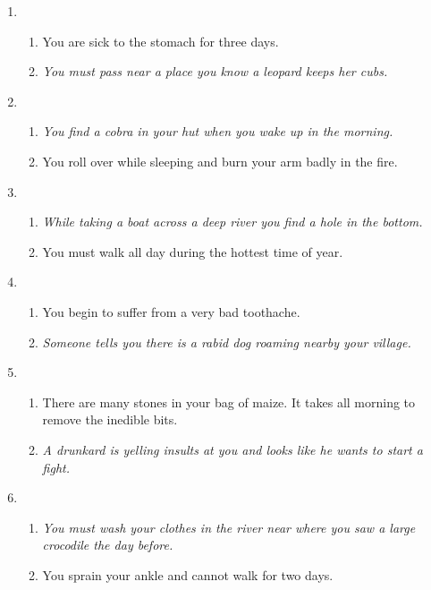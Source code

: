 \documentclass[idxtotoc,hyperref,openany]{labbook} %
\begin{document}
\begin{enumerate}
\item
\begin{enumerate}
\item You are sick to the stomach for three days.
\item  \emph{You must pass near a place you know a leopard keeps her cubs.}
\end{enumerate}

\item
\begin{enumerate} 
\item  \emph{You find a cobra in your hut when you wake up in the morning.}
\item You roll over while sleeping and burn your arm badly in the fire.
\end{enumerate}

\item 
\begin{enumerate} 
\item  \emph{While taking a boat across a deep river you find a hole in the bottom.}
\item   You must walk all day during the hottest time of year.
\end{enumerate}


\item 
\begin{enumerate} 
\item  You begin to suffer from a very bad toothache.
\item   \emph{Someone tells you there is a rabid dog roaming nearby your village.}
\end{enumerate}

\item 
\begin{enumerate} 
\item  There are many stones in your bag of maize. It takes all morning to remove the inedible bits.
\item   \emph{A drunkard is yelling insults at you and looks like he wants to start a fight.}
\end{enumerate}

\item \begin{enumerate} 
\item  \emph{You must wash your clothes in the river near where you saw a large crocodile the day before.}
\item   You sprain your ankle and cannot walk for two days.
\end{enumerate}



\end{enumerate}
\end{document}
